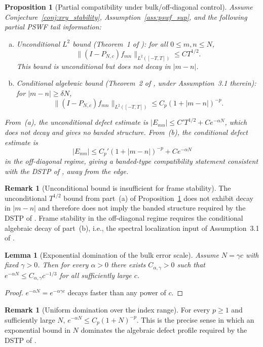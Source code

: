 \documentclass[12pt,a4paper]{amsart}
\newtheorem{lemma}[theorem]{Lemma}
\newtheorem{proposition}[theorem]{Proposition}
\theoremstyle{definition}
\newtheorem{remark}[theorem]{Remark}
\newcommand{\PN}{P_{N,c}}
\begin{document}
\begin{proposition}[Partial compatibility under bulk/off-diagonal control]
\label{prop:partial_compatibility}
Assume Conjecture~\ref{conj:xry_stability}, Assumption~\ref{ass:pswf_sup},
and the following partial PSWF tail information:
\begin{enumerate}[(a)]
\item \emph{Unconditional $L^2$ bound} (Theorem~1 of \cite{PaperIII}):
  for all $0\le m,n\le N$,
  \[
    \|(I-\PN)f_{mn}\|_{L^2([-T,T])} \le C T^{1/2}.
  \]
  This bound is unconditional but does not decay in $|m-n|$.
\item \emph{Conditional algebraic bound} (Theorem~2 of \cite{PaperIII},
  under Assumption~3.1 therein): for $|m-n|\ge\delta N$,
  \[
    \|(I-\PN)f_{mn}\|_{L^2([-T,T])}
    \le C_p(1+|m-n|)^{-p}.
  \]
\end{enumerate}
From~(a), the unconditional defect estimate is
$|E_{mn}| \le C'T^{1/2} + Ce^{-\alpha N}$,
which does not decay and gives no banded structure.
From~(b), the conditional defect estimate is
\[
  |E_{mn}|\le C_p'(1+|m-n|)^{-p}+C e^{-\alpha N}
\]
in the off-diagonal regime, giving a banded-type compatibility statement
consistent with the DSTP of \cite{PaperI}, away from the edge.
\end{proposition}

\begin{remark}[Unconditional bound is insufficient for frame stability]
\label{rem:unconditional-insufficient}
The unconditional $T^{1/2}$ bound from part~(a) of
Proposition~\ref{prop:partial_compatibility} does not exhibit decay
in $|m-n|$ and therefore does not imply the banded structure required
by the DSTP of \cite{PaperI}.
Frame stability in the off-diagonal regime requires the conditional
algebraic decay of part~(b), i.e., the spectral localization input
of Assumption~3.1 of \cite{PaperIII}.
\end{remark}

\begin{lemma}[Exponential domination of the bulk error scale]
\label{lem:bulk_scale}
Assume $N=\gamma c$ with fixed $\gamma>0$. Then for every $\alpha>0$ there
exists $C_{\alpha,\gamma}>0$ such that
$e^{-\alpha N}\le C_{\alpha,\gamma} c^{-1/3}$
for all sufficiently large $c$.
\end{lemma}
\begin{proof}
$e^{-\alpha N}=e^{-\alpha\gamma c}$ decays faster than any power of $c$.
\end{proof}

\begin{remark}[Uniform domination over the index range]\label{rem:index_domination}
For every $p\ge1$ and sufficiently large $N$, $e^{-\alpha N}\le C_p(1+N)^{-p}$.
This is the precise sense in which an exponential bound in $N$ dominates
the algebraic defect profile required by the DSTP of \cite{PaperI}.
\end{remark}
\end{document}
